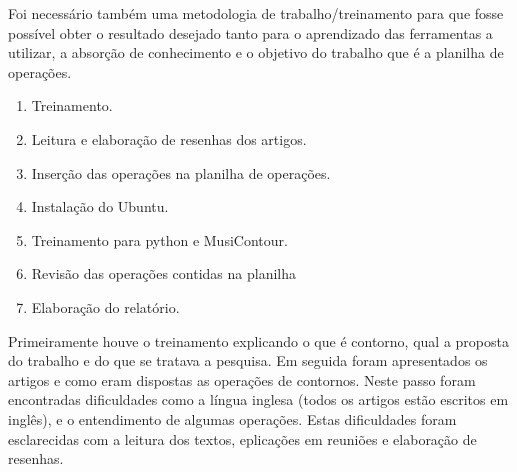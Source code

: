 \documentclass[11pt]{article}
\begin{document}
Foi necessário também uma metodologia de trabalho/treinamento para que fosse possível obter
o resultado desejado tanto para o aprendizado das ferramentas a utilizar, a absorção de conhecimento
e o objetivo do trabalho que é a planilha de operações.

\begin{enumerate}
\item Treinamento.
\item Leitura e elaboração de resenhas dos artigos.
\item Inserção das operações na planilha de operações.
\item Instalação do Ubuntu.
\item Treinamento para python e MusiContour.
\item Revisão das operações contidas na planilha
\item Elaboração do relatório.
\end{enumerate}

Primeiramente houve o treinamento explicando o que é contorno, qual a proposta do trabalho e
do que se tratava a pesquisa. Em seguida foram apresentados os artigos e como eram dispostas
as operações de contornos. Neste passo foram encontradas dificuldades como a língua inglesa (todos
os artigos estão escritos em inglês), e o entendimento de algumas operações. Estas dificuldades
foram esclarecidas com a leitura dos textos, eplicações em reuniões e elaboração de resenhas.

\end{document}
